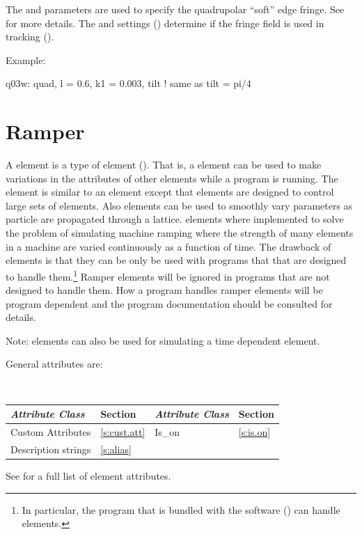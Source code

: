 {The  and  parameters are used to specify the
quadrupolar ``soft'' edge fringe. See  for more details.
The  and  settings ()
determine if the fringe field is used in tracking ().

Example:
\begin{example}
  q03w: quad, l = 0.6, k1 = 0.003, tilt  ! same as tilt = pi/4
\end{example}

\newpage

\section{Ramper}
\label{s:ramper}

A  element is a type of  element (). That is, a
 element can be used to make variations in the attributes of other elements while a
program is running. The  element is similar to an  element except that
 elements are designed to control large sets of elements. Also  elements can
be used to smoothly vary parameters as particle are propagated through a lattice. 
elements where implemented to solve the problem of simulating machine ramping where the strength of
many elements in a machine are varied continuously as a function of time. The drawback of
 elements is that they can be only be used with programs that that are designed to handle
them.\footnote
  {
In particular, the  program that is bundled with the \bmad software
() can handle  elements.
  }
Ramper elements will be ignored in programs that are not designed to handle them. How a program
handles ramper elements will be program dependent and the program documentation should be consulted
for details.

Note:  elements can also be used for simulating a time dependent element.

General  attributes are:
\begin{center}
\tt
\begin{tabular}{llll} \toprule
  {\sl Attribute Class}      & Section           & {\sl Attribute Class}      & Section         \\ \midrule
  Custom Attributes          & \ref{s:cust.att}  & Is_on                      & \ref{s:is.on}   \\
  Description strings        & \ref{s:alias}     &                            &                 \\ 
  \bottomrule
\end{tabular}
\end{center}
\toffset
See  for a full list of element attributes.

}
